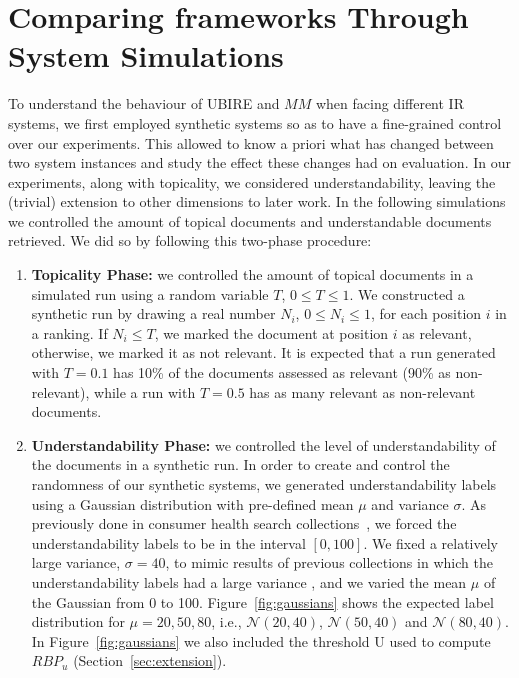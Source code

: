 



\section{Comparing frameworks Through System Simulations}
\label{sec:simulations}

To understand the behaviour of UBIRE and $MM$ when facing different IR systems, we first employed synthetic systems so as to have a fine-grained control over our experiments. This allowed to know a priori what has changed between two system instances and study the effect these changes had on evaluation. In our experiments, along with topicality, we considered understandability, leaving the (trivial) extension to other dimensions to later work. 
In the following simulations we controlled the amount of topical documents and understandable documents retrieved. We did so by following this two-phase procedure:

\begin{enumerate}
\item \textbf{Topicality Phase:} we controlled the amount of topical documents in a simulated run using a random variable $T$, $0 \le T \le 1$. 
We constructed a synthetic run by drawing a real number $N_i$, $0 \le N_i \le 1$, for each position $i$ in a ranking. If $N_i \le T$, we marked the document at position $i$ as relevant, otherwise, we marked it as not relevant. It is expected that a run generated with $T=0.1$ has 10\% of the documents assessed as relevant (90\% as non-relevant), while a run with $T=0.5$ has as many relevant as non-relevant documents. 

\item \textbf{Understandability Phase:}  we controlled the level of understandability of the documents in a synthetic run. In order to create and control the randomness of our synthetic systems, we generated understandability labels using a Gaussian distribution with pre-defined mean $\mu$ and variance $\sigma$. 
As previously done in consumer health search collections~\cite{clefIR16,clefIR17}, we forced the understandability labels to be in the interval $[0,100]$. 
We fixed a relatively large variance, $\sigma=40$, to mimic results of previous collections in which the understandability labels had a large variance \cite{clefIR16}, and we varied the mean $\mu$ of the Gaussian from 0 to 100. Figure~\ref{fig:gaussians} shows the expected label distribution for $\mu=20, 50, 80$, i.e., $\mathcal{N}(20, 40)$, $\mathcal{N}(50, 40)$ and $\mathcal{N}(80, 40)$.
In Figure~\ref{fig:gaussians} we also included the threshold U used to compute $RBP_u$ (Section~\ref{sec:extension}).
\end{enumerate}

